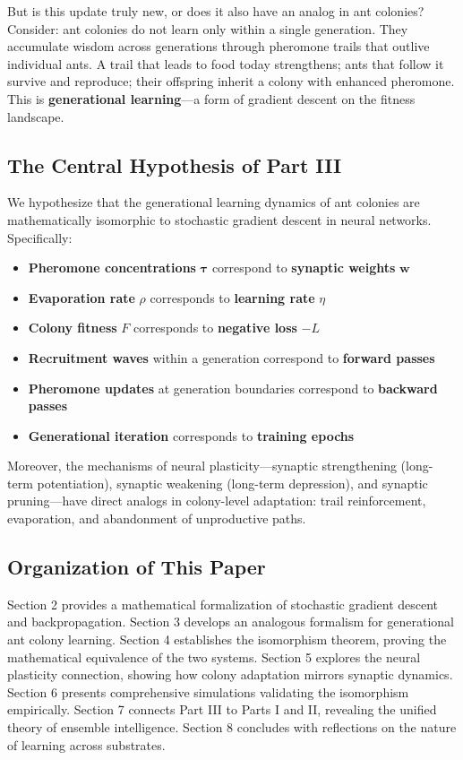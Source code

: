 \documentclass[12pt,letterpaper]{article}
\begin{document}
But is this update truly new, or does it also have an analog in ant colonies? Consider: ant colonies do not learn only within a single generation. They accumulate wisdom across generations through pheromone trails that outlive individual ants. A trail that leads to food today strengthens; ants that follow it survive and reproduce; their offspring inherit a colony with enhanced pheromone. This is \textbf{generational learning}—a form of gradient descent on the fitness landscape.

\subsection{The Central Hypothesis of Part III}

We hypothesize that the generational learning dynamics of ant colonies are mathematically isomorphic to stochastic gradient descent in neural networks. Specifically:

\begin{itemize}
    \item \textbf{Pheromone concentrations} $\boldsymbol{\tau}$ correspond to \textbf{synaptic weights} $\mathbf{w}$
    \item \textbf{Evaporation rate} $\rho$ corresponds to \textbf{learning rate} $\eta$
    \item \textbf{Colony fitness} $F$ corresponds to \textbf{negative loss} $-L$
    \item \textbf{Recruitment waves} within a generation correspond to \textbf{forward passes}
    \item \textbf{Pheromone updates} at generation boundaries correspond to \textbf{backward passes}
    \item \textbf{Generational iteration} corresponds to \textbf{training epochs}
\end{itemize}

Moreover, the mechanisms of neural plasticity—synaptic strengthening (long-term potentiation), synaptic weakening (long-term depression), and synaptic pruning—have direct analogs in colony-level adaptation: trail reinforcement, evaporation, and abandonment of unproductive paths.

\subsection{Organization of This Paper}

Section 2 provides a mathematical formalization of stochastic gradient descent and backpropagation. Section 3 develops an analogous formalism for generational ant colony learning. Section 4 establishes the isomorphism theorem, proving the mathematical equivalence of the two systems. Section 5 explores the neural plasticity connection, showing how colony adaptation mirrors synaptic dynamics. Section 6 presents comprehensive simulations validating the isomorphism empirically. Section 7 connects Part III to Parts I and II, revealing the unified theory of ensemble intelligence. Section 8 concludes with reflections on the nature of learning across substrates.
\end{document}
